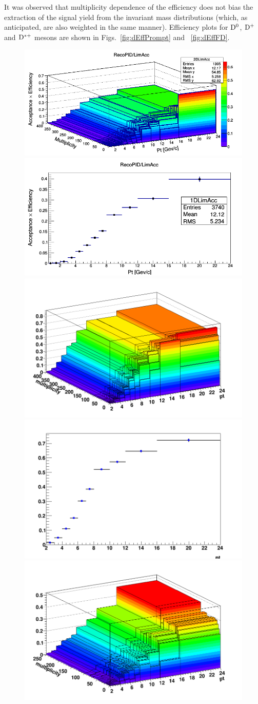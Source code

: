 It was observed that multiplicity dependence of the efficiency does not bias the extraction of the signal yield from the invariant mass distributions (which, as anticipated, are also weighted in the same manner). Efficiency plots for ${\rm D^0}$, ${\rm D^+}$ and ${\rm D^{*+}}$ mesons are shown in Figs.~\ref{fig:dEffPrompt} and ~\ref{fig:dEffFD}.

\begin{figure}[!htp]     %
	\centering
    \includegraphics[width=.48\linewidth]{figures/Effs/EfficiencyMap_2D_DPlus_c_Ref_wLimAcc_Plot.png}
	\includegraphics[width=.48\linewidth]{figures/Effs/EfficiencyMap_1D_DPlus_c_Ref_wLimAcc_Plot.png}  %
	\includegraphics[width=.48\linewidth]{figures/Effs/EfficiencyMap_2D_DStar_c_Ref_wLimAcc_Plot.png}
	\includegraphics[width=.48\linewidth]{figures/Effs/EfficiencyMap_1D_DStar_c_Ref_wLimAcc_Plot.png}  %
	\includegraphics[width=.48\linewidth]{figures/Effs/EfficiencyMap_2D_Dzero_c_Ref_wLimAcc_Plot.png}

\end{figure}
